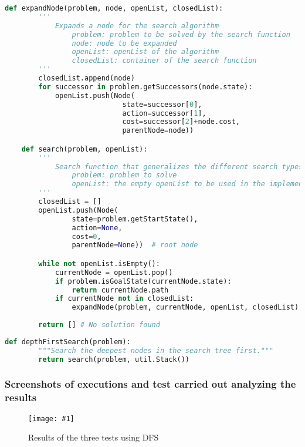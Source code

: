\documentclass{article}
\newcommand{\myFigure}[4]{%
    \begin{figure}[H]
        \texttt{[image: \#1]}
        \centering
        \caption{#2}
        \label{#3}
    \end{figure}
}
\begin{document}
\begin{lstlisting}[language=python, captionpos=t, caption = {The search function (\emph{search.py})}]
    def expandNode(problem, node, openList, closedList):
        '''
            Expands a node for the search algorithm
                problem: problem to be solved by the search function
                node: node to be expanded
                openList: openList of the algorithm
                closedList: container of the search function
        '''
        closedList.append(node)
        for successor in problem.getSuccessors(node.state):
            openList.push(Node(
                            state=successor[0],
                            action=successor[1],
                            cost=successor[2]+node.cost, 
                            parentNode=node))

    def search(problem, openList):
        '''
            Search function that generalizes the different search types. 
                problem: problem to solve
                openList: the empty openList to be used in the implementation.
        '''
        closedList = []
        openList.push(Node(
                state=problem.getStartState(), 
                action=None, 
                cost=0, 
                parentNode=None))  # root node

        while not openList.isEmpty(): 
            currentNode = openList.pop()
            if problem.isGoalState(currentNode.state):
                return currentNode.path
            if currentNode not in closedList:
                expandNode(problem, currentNode, openList, closedList)
        
        return [] # No solution found  
\end{lstlisting}


\begin{lstlisting}[language=python, captionpos=t, caption={The \emph{DFS} function (\emph{search.py})}]
    def depthFirstSearch(problem):
        """Search the deepest nodes in the search tree first."""
        return search(problem, util.Stack())
\end{lstlisting}

\subsubsection{Screenshots of executions and test carried out analyzing the results}

\myFigure{./img/ex1/victoryDFS}{Results of the three tests using DFS}{victoryDFS}{.8}
\end{document}
